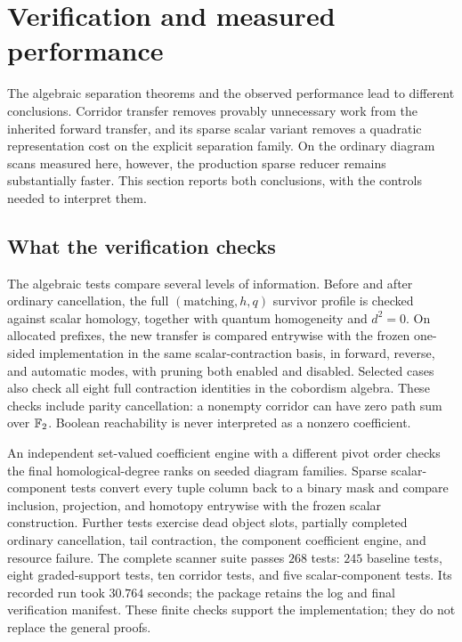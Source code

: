 \section{Verification and measured performance}
\label{sec:experiments}

The algebraic separation theorems and the observed performance lead to
different conclusions. Corridor transfer removes provably unnecessary
work from the inherited forward transfer, and its sparse scalar variant
removes a quadratic representation cost on the explicit separation
family. On the ordinary diagram scans measured here, however, the
production sparse reducer remains substantially faster. This section
reports both conclusions, with the controls needed to interpret them.

\subsection{What the verification checks}

The algebraic tests compare several levels of information. Before and
after ordinary cancellation, the full
\((\text{matching},h,q)\) survivor profile is checked against scalar
homology, together with quantum homogeneity and \(d^2=0\). On allocated
prefixes, the new transfer is compared entrywise with the frozen
one-sided implementation in the same scalar-contraction basis, in
forward, reverse, and automatic modes, with pruning both enabled and
disabled. Selected cases also check all eight full contraction
identities in the cobordism algebra. These checks include parity
cancellation: a nonempty corridor can have zero path sum over \(\mathbb F_2\).
Boolean reachability is never interpreted as a nonzero coefficient.

An independent set-valued coefficient engine with a different pivot
order checks the final homological-degree ranks on seeded diagram
families. Sparse scalar-component tests convert every tuple column
back to a binary mask and compare inclusion, projection, and homotopy
entrywise with the frozen scalar construction. Further tests exercise
dead object slots, partially completed ordinary cancellation, tail
contraction, the component coefficient engine, and resource failure.
The complete scanner suite passes \(268\) tests: \(245\) baseline
tests, eight graded-support tests, ten corridor tests, and five
scalar-component tests. Its recorded run took \(30.764\) seconds;
the package retains the log and final verification manifest.
These finite checks support the implementation; they do not replace
the general proofs.

